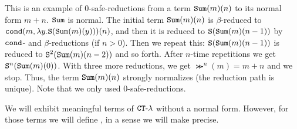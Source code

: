 \begin{Eg}
  This is an example of $0$-safe-reductions from a term ${\tt Sum}(m)(n)$ to
  its normal form $m+n$. 
  ${\tt Sum}$ is normal. The initial term ${\tt Sum}(m)(n)$ is $\beta$-reduced to
  ${\tt cond}(m,\lambda y.{\tt S}({\tt Sum}(m)(y)))(n)$, and then
  it is reduced to ${\tt S}({\tt Sum}(m)(n-1))$ by ${\tt cond}$- and $\beta$-reductions (if $n>0$).
  Then we repeat this: ${\tt S}({\tt Sum}(m)(n-1))$ is reduced to 
  ${\tt S}^2({\tt Sum}(m)(n-2))$ and so forth.
  After $n$-time repetitions we get ${\tt S}^n({\tt Sum}(m)(0))$.
  With three more reductions, we get $\Succ^n(m) = m+n$ and we stop.
  Thus, the term ${\tt Sum}(m)(n)$ strongly normalizes (the reduction path is unique).
  Note that we only used $0$-safe-reductions.
\end{Eg}

We will exhibit meaningful terms of ${ {\tt CT}\mbox{-}\lambda}$ without a normal form. 
However, for those terms we will define ,
in a sense we will make precise.

